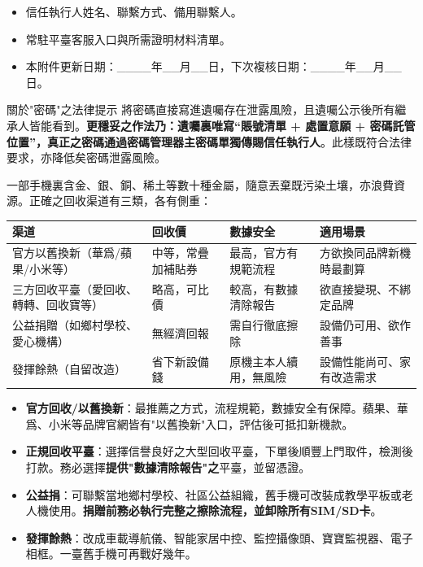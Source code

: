 \begin{itemize}
  \item 信任執行人姓名、聯繫方式、備用聯繫人。
  \item 常駐平臺客服入口與所需證明材料清單。
  \item 本附件更新日期：\_\_\_\_年\_\_月\_\_日，下次複核日期：\_\_\_\_年\_\_月\_\_日。
\end{itemize}

\begin{tcbwarn}{關於"密碼"之法律提示}
將密碼直接寫進遺囑存在泄露風險，且遺囑公示後所有繼承人皆能看到。\textbf{更穩妥之作法乃：遺囑裏唯寫“賬號清單 + 處置意願 + 密碼託管位置”，真正之密碼通過密碼管理器主密碼單獨傳賜信任執行人}。此樣既符合法律要求，亦降低矣密碼泄露風險。

\end{tcbwarn}


一部手機裏含金、銀、銅、稀土等數十種金屬，隨意丟棄既污染土壤，亦浪費資源。正確之回收渠道有三類，各有側重：

\begin{center}
\begin{tabularx}{\linewidth}{|X|X|X|X|}
\hline
\textbf{渠道} & \textbf{回收價} & \textbf{數據安全} & \textbf{適用場景} \tabularnewline
\hline
官方以舊換新（華爲/蘋果/小米等） & 中等，常疊加補貼券 & 最高，官方有規範流程 & 方欲換同品牌新機時最劃算 \tabularnewline
三方回收平臺（愛回收、轉轉、回收寶等） & 略高，可比價 & 較高，有數據清除報告 & 欲直接變現、不綁定品牌 \tabularnewline
公益捐贈（如鄉村學校、愛心機構） & 無經濟回報 & 需自行徹底擦除 & 設備仍可用、欲作善事 \tabularnewline
發揮餘熱（自留改造） & 省下新設備錢 & 原機主本人續用，無風險 & 設備性能尚可、家有改造需求 \tabularnewline
\hline
\end{tabularx}
\end{center}

\begin{itemize}
  \item \textbf{官方回收/以舊換新}：最推薦之方式，流程規範，數據安全有保障。蘋果、華爲、小米等品牌官網皆有"以舊換新"入口，評估後可抵扣新機款。
  \item \textbf{正規回收平臺}：選擇信譽良好之大型回收平臺，下單後順豐上門取件，檢測後打款。務必選擇\textbf{提供"數據清除報告"之}平臺，並留憑證。
  \item \textbf{公益捐}：可聯繫當地鄉村學校、社區公益組織，舊手機可改裝成教學平板或老人機使用。\textbf{捐贈前務必執行完整之擦除流程，並卸除所有SIM/SD卡}。
  \item \textbf{發揮餘熱}：改成車載導航儀、智能家居中控、監控攝像頭、寶寶監視器、電子相框。一臺舊手機可再戰好幾年。
\end{itemize}

